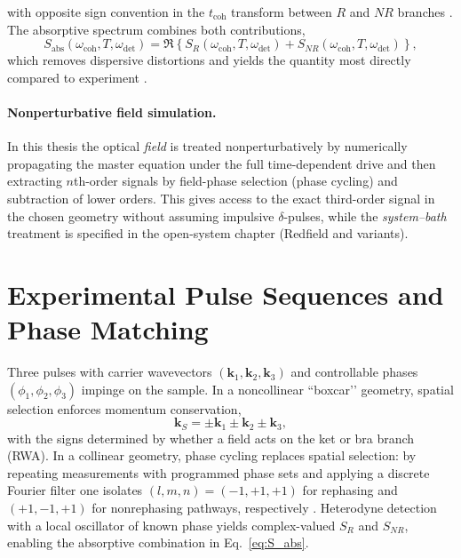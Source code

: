 with opposite sign convention in the $t_{\mathrm{coh}}$ transform between $R$ and $NR$ branches \cite{cho2009twodimensionalopticalspectroscopy}. The absorptive spectrum combines both contributions,
\begin{equation}
    S_{\mathrm{abs}}(\omega_{\mathrm{coh}},T,\omega_{\mathrm{det}})=
    \Re\!\left\{S_R(\omega_{\mathrm{coh}},T,\omega_{\mathrm{det}})+S_{NR}(\omega_{\mathrm{coh}},T,\omega_{\mathrm{det}})\right\},
    \label{final:eq:S_abs}
\end{equation}
which removes dispersive distortions and yields the quantity most directly compared to experiment \cite{jonas2003twodimensionalelectronicspectroscopy}.

\paragraph{Nonperturbative field simulation.}
In this thesis the optical \emph{field} is treated nonperturbatively by numerically propagating the master equation under the full time-dependent drive and then extracting $n$th-order signals by field-phase selection (phase cycling) and subtraction of lower orders. This gives access to the exact third-order signal in the chosen geometry without assuming impulsive $\delta$-pulses, while the \emph{system--bath} treatment is specified in the open-system chapter (Redfield and variants).

\section{Experimental Pulse Sequences and Phase Matching}
\label{final:sec:phase_matching}
\noindent
Three pulses with carrier wavevectors $(\boldsymbol{k}_1,\boldsymbol{k}_2,\boldsymbol{k}_3)$ and controllable phases $(\phi_1,\phi_2,\phi_3)$ impinge on the sample. In a noncollinear ``boxcar’’ geometry, spatial selection enforces momentum conservation,
\begin{equation}
    \boldsymbol{k}_S=\pm \boldsymbol{k}_1 \pm \boldsymbol{k}_2 \pm \boldsymbol{k}_3,
    \label{final:eq:PM_general}
\end{equation}
with the signs determined by whether a field acts on the ket or bra branch (RWA). In a collinear geometry, phase cycling replaces spatial selection: by repeating measurements with programmed phase sets and applying a discrete Fourier filter one isolates $(l,m,n)=(-1,+1,+1)$ for rephasing and $(+1,-1,+1)$ for nonrephasing pathways, respectively \cite{hamm2005principlesnonlinearoptical, cho2009twodimensionalopticalspectroscopy}. Heterodyne detection with a local oscillator of known phase yields complex-valued $S_R$ and $S_{NR}$, enabling the absorptive combination in Eq.~\eqref{eq:S_abs}.

